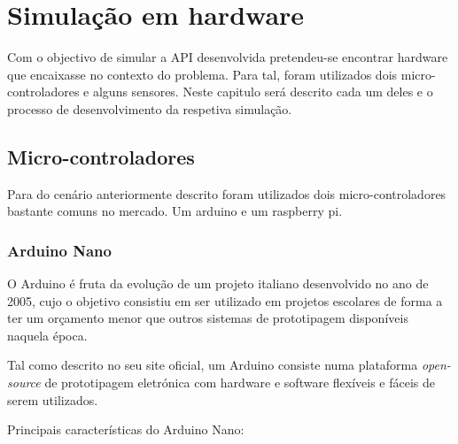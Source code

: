 
\chapter{Simulação em hardware}

Com o objectivo de simular a API desenvolvida pretendeu-se encontrar hardware que encaixasse no contexto do problema. Para tal, foram utilizados dois micro-controladores e alguns sensores. Neste capitulo será descrito cada um deles e o processo de desenvolvimento da respetiva simulação.  


\section{Micro-controladores}


Para do cenário anteriormente descrito foram utilizados dois micro-controladores bastante comuns no mercado. Um arduino e um raspberry pi.  

\subsection{Arduino Nano}


O Arduino é fruta da evolução de um projeto italiano desenvolvido no ano de 2005, cujo o objetivo consistiu em ser utilizado em projetos escolares de forma a ter um orçamento menor que outros sistemas de prototipagem disponíveis naquela época.

Tal como descrito no seu site oficial, um Arduino consiste numa plataforma \textit{open-source} de prototipagem eletrónica com hardware e software flexíveis e fáceis de serem utilizados. 



Principais características do Arduino Nano: 

